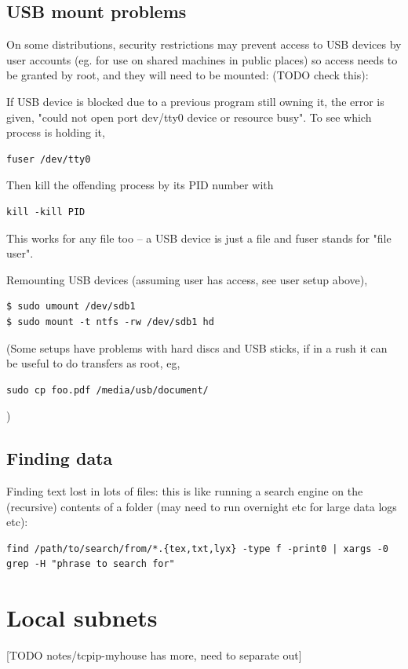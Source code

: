 \documentclass[oneside,english]{scrbook}
\begin{document}
\section{USB mount problems}

On some distributions, security restrictions may prevent access to USB devices by user accounts (eg. for use on shared machines in public places) so access needs to be granted by root, and they will need to be mounted: (TODO check this):

If USB device is blocked due to a previous program still owning it, the error is given, "could not open port dev/tty0 device or resource busy".   To see which process is holding it,
\begin{lstlisting}
fuser /dev/tty0
\end{lstlisting}
Then kill the offending process by its PID number with
\begin{lstlisting}
kill -kill PID
\end{lstlisting}
This works for any file too -- a USB device is just a file and fuser stands for "file user".

Remounting USB devices (assuming user has access, see user setup above),
\begin{lstlisting}
$ sudo umount /dev/sdb1
$ sudo mount -t ntfs -rw /dev/sdb1 hd
\end{lstlisting}

(Some setups have problems with hard discs and USB sticks, if in a rush it can be useful to do transfers as root, eg, 
\begin{lstlisting}
sudo cp foo.pdf /media/usb/document/
\end{lstlisting}
)

\section{Finding data}
Finding text lost in lots of files: this is like running a search engine on the (recursive) contents of a folder (may need to run overnight etc for large data logs etc):
\begin{lstlisting}
find /path/to/search/from/*.{tex,txt,lyx} -type f -print0 | xargs -0 grep -H "phrase to search for"
\end{lstlisting}

\chapter{Local subnets}

[TODO notes/tcpip-myhouse has more, need to separate out]
\end{document}
